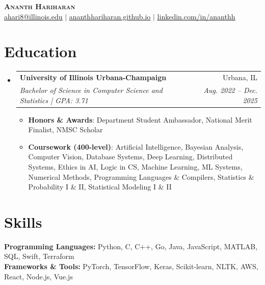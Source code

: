 \documentclass[letterpaper,11pt]{article}
\makeatletter
\newcommand{\resumeItem}[1]{
  \item\small{
    {#1 \vspace{-2pt}}
  }
}
\newcommand{\resumeSubheading}[4]{
  \vspace{-2pt}\item
    \begin{tabular*}{0.97\textwidth}[t]{l@{\extracolsep{\fill}}r}
      \textbf{#1} & #2 \\
      \textit{\small#3} & \textit{\small #4} \\
    \end{tabular*}\vspace{-7pt}
}
\newcommand{\resumeSubHeadingListStart}{\begin{itemize}[leftmargin=0.15in, label={}]}
\newcommand{\resumeSubHeadingListEnd}{\end{itemize}}
\newcommand{\resumeItemListStart}{\begin{itemize}}
\newcommand{\resumeItemListEnd}{\end{itemize}\vspace{-5pt}}
\makeatother
\begin{document}

\begin{center}
    \textbf{\Huge \scshape Ananth Hariharan} \\ \vspace{1pt}\href{mailto:ahari8@illinois.edu}{\underline{ahari8@illinois.edu}} $|$ 
    \href{https://ananthhariharan.github.io}{\underline{ananthhariharan.github.io}} $|$
    \small \href{https://linkedin.com/in/ananthh}{\underline{linkedin.com/in/ananthh}}
\end{center}


\section{Education}
  \resumeSubHeadingListStart
    \resumeSubheading
      {University of Illinois Urbana-Champaign}{Urbana, IL}
      {Bachelor of Science in Computer Science and Statistics | GPA: 3.71}{Aug. 2022 -- Dec. 2025}
      \resumeItemListStart
        \resumeItem
        {\textbf{Honors \& Awards}: Department Student Ambassador, National Merit Finalist, NMSC Scholar} 
        \resumeItem
        {\textbf{Coursework (400-level)}: Artificial Intelligence, Bayesian Analysis, Computer Vision, Database Systems, Deep Learning, Distributed Systems, Ethics in AI, Logic in CS, Machine Learning, ML Systems, Numerical Methods, Programming Languages \& Compilers, Statistics \& Probability I \& II, Statistical Modeling I \& II} 
      \resumeItemListEnd
  \resumeSubHeadingListEnd

%
\section{Skills}
\textbf{Programming Languages:} Python, C, C++, Go, Java, JavaScript, MATLAB, SQL, Swift, Terraform\\
\textbf{Frameworks \& Tools:} PyTorch, TensorFlow, Keras, Scikit-learn, NLTK, AWS, React, Node.js, Vue.js
\end{document}
